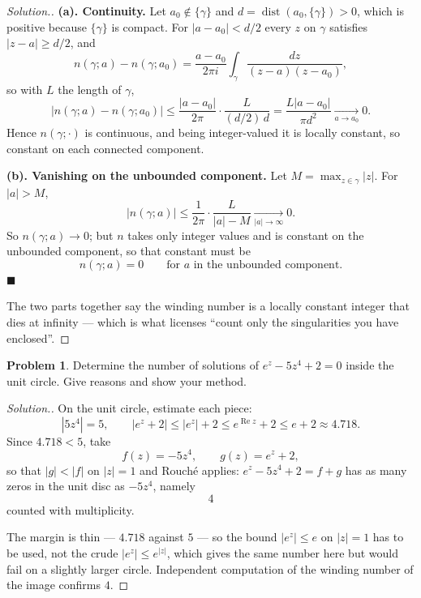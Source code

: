 \documentclass[11pt,a4paper]{article}
\theoremstyle{definition}
\newtheorem{problemx}{Problem}[section]
\newenvironment{problem}{\begin{problemx}}{\end{problemx}}
\newenvironment{solution}
  {\renewcommand{\qedsymbol}{}\begin{proof}[\textit{Solution}.]}
  {\end{proof}}
\begin{document}
\begin{solution}
\textbf{(a). Continuity.} Let $a_0 \notin \{\gamma\}$ and
$d = \operatorname{dist}(a_0,\{\gamma\}) > 0$, which is positive because
$\{\gamma\}$ is compact. For $\left|a - a_0\right| < d/2$ every $z$ on $\gamma$
satisfies $\left|z-a\right| \geq d/2$, and
$$n(\gamma;a) - n(\gamma;a_0)
= \frac{a-a_0}{2\pi i}\int_{\gamma}\frac{dz}{(z-a)(z-a_0)},$$
so with $L$ the length of $\gamma$,
$$\left|n(\gamma;a) - n(\gamma;a_0)\right|
\leq \frac{\left|a-a_0\right|}{2\pi}\cdot\frac{L}{(d/2)\,d}
= \frac{L\left|a-a_0\right|}{\pi d^{2}} \xrightarrow[a \to a_0]{} 0 .$$
Hence $n(\gamma;\cdot)$ is continuous, and being integer-valued it is locally
constant, so constant on each connected component.

\textbf{(b). Vanishing on the unbounded component.} Let
$M = \max_{z\in\gamma}\left|z\right|$. For $\left|a\right| > M$,
$$\left|n(\gamma;a)\right|
\leq \frac{1}{2\pi}\cdot\frac{L}{\left|a\right| - M}
\xrightarrow[\left|a\right|\to\infty]{} 0 .$$
So $n(\gamma;a) \rightarrow 0$; but $n$ takes only integer values and is constant
on the unbounded component, so that constant must be
$$\boxed{n(\gamma;a) = 0 \qquad\text{for } a \text{ in the unbounded component.}}$$
$\blacksquare$

The two parts together say the winding number is a locally constant integer that
dies at infinity --- which is what licenses ``count only the singularities you have
enclosed''.
\end{solution}


\begin{problem}
Determine the number of solutions of $e^{z} - 5z^{4} + 2 = 0$ inside the unit
circle. Give reasons and show your method.
\end{problem}

\begin{solution}
On the unit circle, estimate each piece:
$$\left|5z^{4}\right| = 5,\qquad
\left|e^{z} + 2\right| \leq \left|e^{z}\right| + 2
\leq e^{\operatorname{Re}z} + 2 \leq e + 2 \approx 4.718 .$$
Since $4.718 < 5$, take
$$f(z) = -5z^{4},\qquad g(z) = e^{z}+2,$$
so that $\left|g\right| < \left|f\right|$ on $\left|z\right| = 1$ and Rouch\'e
applies: $e^{z}-5z^{4}+2 = f+g$ has as many zeros in the unit disc as $-5z^{4}$,
namely
$$\boxed{4}$$
counted with multiplicity.

The margin is thin --- $4.718$ against $5$ --- so the bound
$\left|e^{z}\right| \leq e$ on $\left|z\right|=1$ has to be used, not the crude
$\left|e^{z}\right| \leq e^{\left|z\right|}$, which gives the same number here but
would fail on a slightly larger circle. Independent computation of the winding
number of the image confirms $4$.
\end{solution}
\end{document}
